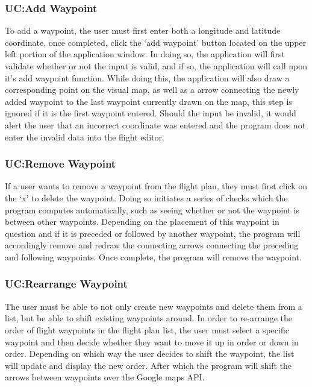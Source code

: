 \documentclass[12pt, letterpaper]{article}
\begin{document}
\subsubsection{UC:Add Waypoint}\label{sec:addwp}
To add a waypoint, the user must first enter both a longitude and latitude coordinate, once completed, click the `add waypoint' button located on the upper left portion of the application window.
In doing so, the application will first validate whether or not the input is valid, and if so, the application will call upon it's add waypoint function.
While doing this, the application will also draw a corresponding point on the visual map, as well as a arrow connecting the newly added waypoint to the last waypoint currently drawn on the map, this step is ignored if it is the first waypoint entered.
Should the input be invalid, it would alert the user that an incorrect coordinate was entered and the program does not enter the invalid data into the flight editor.

\clearpage
\subsubsection{UC:Remove Waypoint}\label{sec:rmwp}
If a user wants to remove a waypoint from the flight plan, they must first click on the `x' to delete the waypoint.
Doing so initiates a series of checks which the program computes automatically, such as seeing whether or not the waypoint is between other waypoints.
Depending on the placement of this waypoint in question and if it is preceded or followed by another waypoint, the program will accordingly remove and redraw the connecting arrows connecting the preceding and following waypoints.
Once complete, the program will remove the waypoint.

\clearpage
\subsubsection{UC:Rearrange Waypoint}\label{sec:rearrangewp}
The user must be able to not only create new waypoints and delete them from a list, but be able to shift existing waypoints around.
In order to re-arrange the order of flight waypoints in the flight plan list, the user must select a specific waypoint and then decide whether they want to move it up in order or down in order.
Depending on which way the user decides to shift the waypoint, the list will update and display the new order.
After which the program will shift the arrows between waypoints over the Google maps API.
\end{document}
